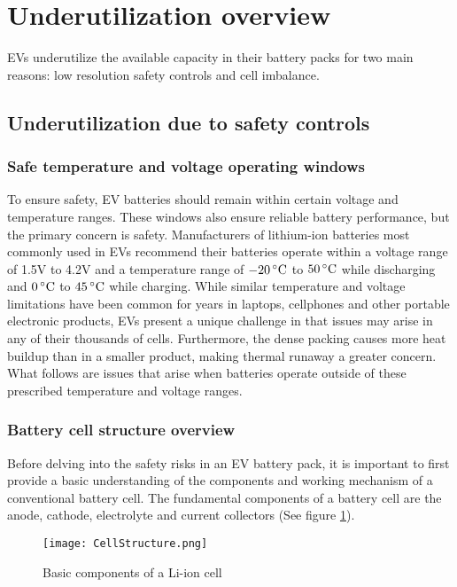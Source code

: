	\section{Underutilization overview}
		EVs underutilize the available capacity in their battery packs for two main reasons:  low resolution safety controls and cell imbalance.
	\subsection{Underutilization due to safety controls}
%
		\subsubsection{Safe temperature and voltage operating windows}
		To ensure safety, EV batteries should remain within certain voltage and temperature ranges. These windows also ensure reliable battery performance, but the primary concern is safety. Manufacturers of lithium-ion batteries most commonly used in EVs recommend their batteries operate within a voltage range of 1.5V to 4.2V and a temperature range of $-20\,^{\circ}{\rm C}$ to $50\,^{\circ}{\rm C}$ while discharging and $0\,^{\circ}{\rm C}$ to $45\,^{\circ}{\rm C}$ while charging. While similar temperature and voltage limitations have been common for years in laptops, cellphones and other portable electronic products, EVs present a unique challenge in that issues may arise in any of their thousands of cells. Furthermore, the dense packing causes more heat buildup than in a smaller product, making thermal runaway a greater concern. What follows are issues that arise when batteries operate outside of these prescribed temperature and voltage ranges\cite[p.~272]{LanguangLuXuebingHanJianqiuLiJianfengHua2013}.%
		\subsubsection{Battery cell structure overview}
		Before delving into the safety risks in an EV battery pack, it is important to first provide a basic understanding of the components and working mechanism of a conventional battery cell. The fundamental components of a battery cell are the anode, cathode, electrolyte and current collectors (See figure \ref{fig:CellStructure}). 
\begin{figure}[H]
\centering
\texttt{[image: CellStructure.png]}
\caption{Basic components of a Li-ion cell
\label{fig:CellStructure}
\cite{ElectropaediaCellChemistries}}
\end{figure}

